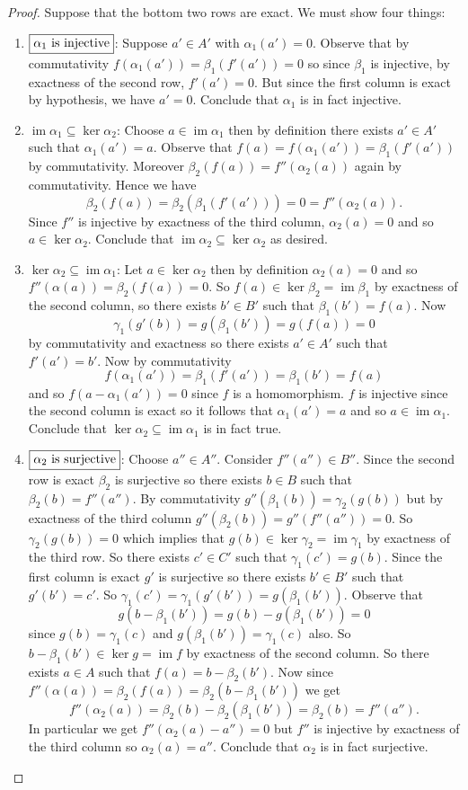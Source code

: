 \documentclass[8pt]{amsart}
\theoremstyle{plain}%
\theoremstyle{definition}
\theoremstyle{remark}
\numberwithin{equation}{section}
\newcommand{\im}{\operatorname{im}}
\begin{document}
	\begin{proof}
		Suppose that the bottom two rows are exact. We must show four things:
		\begin{enumerate}
			\item $\boxed{\alpha_1$ is injective$}$: Suppose $a' \in A'$ with $\alpha_1(a') = 0$. Observe that by commutativity $f(\alpha_1(a')) = \beta_1(f'(a')) = 0$ so since $\beta_1$ is injective, by exactness of the second row, $f'(a') = 0$. But since the first column is exact by hypothesis, we have $a' = 0$. Conclude that $\alpha_1$ is in fact injective.
			\item $\boxed{\im \alpha_1 \subseteq \ker \alpha_2}$: Choose $a \in \im \alpha_1$ then by definition there exists $a' \in A'$ such that $\alpha_1(a') = a$. Observe that $f(a) = f(\alpha_1(a')) = \beta_1(f'(a'))$ by commutativity. Moreover $\beta_2(f(a)) = f''(\alpha_2(a))$ again by commutativity. Hence we have $$\beta_2(f(a)) = \beta_2(\beta_1(f'(a'))) = 0 = f''(\alpha_2(a)).$$ Since $f''$ is injective by exactness of the third column, $\alpha_2(a) = 0$ and so $a \in \ker \alpha_2$. Conclude that $\im \alpha_2 \subseteq \ker \alpha_2$ as desired.
			\item $\boxed{\ker \alpha_2 \subseteq \im \alpha_1}$: Let $a \in \ker \alpha_2$ then by definition $\alpha_2(a) = 0$ and so $f''(\alpha(a)) = \beta_2(f(a)) = 0$. So $f(a) \in \ker \beta_2 = \im \beta_1$ by exactness of the second column, so there exists $b' \in B'$ such that $\beta_1(b') = f(a)$. Now $$\gamma_1(g'(b)) = g(\beta_1(b')) = g(f(a)) = 0$$ by commutativity and exactness so there exists $a' \in A'$ such that $f'(a') = b'$. Now by commutativity $$f(\alpha_1(a')) = \beta_1(f'(a')) = \beta_1(b') = f(a)$$ and so $f(a - \alpha_1(a')) = 0$ since $f$ is a homomorphism. $f$ is injective since the second column is exact so it follows that $\alpha_1(a') = a$ and so $a \in \im \alpha_1$. Conclude that $\ker \alpha_2 \subseteq \im \alpha_1$ is in fact true.
			\item $\boxed{\alpha_2$ is surjective$}$: Choose $a'' \in A''$. Consider $f''(a'') \in B''$. Since the second row is exact $\beta_2$ is surjective so there exists $b \in B$ such that $\beta_2(b) = f''(a'')$. By commutativity $g''(\beta_1(b)) = \gamma_2(g(b))$ but by exactness of the third column $g''(\beta_2(b)) = g''(f''(a'')) = 0$. So $\gamma_2(g(b)) = 0$ which implies that $g(b) \in \ker \gamma_2 = \im \gamma_1$ by exactness of the third row. So there exists $c' \in C'$ such that $\gamma_1(c') = g(b)$. Since the first column is exact $g'$ is surjective so there exists $b' \in B'$ such that $g'(b') = c'$. So $\gamma_1(c') = \gamma_1(g'(b')) = g(\beta_1(b'))$. Observe that $$g(b - \beta_1(b')) = g(b) - g(\beta_1(b')) = 0$$ since $g(b) = \gamma_1(c)$ and $g(\beta_1(b')) = \gamma_1(c)$ also. So $b - \beta_1(b') \in \ker g = \im f$ by exactness of the second column. So there exists $a \in A$ such that $f(a) = b - \beta_2(b')$. Now since $f''(\alpha(a)) = \beta_2(f(a)) = \beta_2(b - \beta_1(b'))$ we get $$f''(\alpha_2(a)) = \beta_2(b) - \beta_2(\beta_1(b')) = \beta_2(b) = f''(a'').$$ In particular we get $f''(\alpha_2(a) - a'') = 0$ but $f''$ is injective by exactness of the third column so $\alpha_2(a) = a''$. Conclude that $\alpha_2$ is in fact surjective.

\end{enumerate}
\end{proof}
\end{document}
